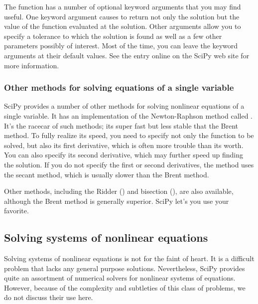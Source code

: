 \documentclass[letterpaper,10pt,english]{sphinxmanual}
\begin{document}
The  function has a number of optional keyword arguments that you may find useful.  One keyword argument causes  to return not only the solution but the value of the function evaluated at the solution.  Other arguments allow you to specify a tolerance to which the solution is found as well as a few other parameters possibly of interest.  Most of the time, you can leave the keyword arguments at their default values.  See the  entry online on the SciPy web site for more information.


\subsubsection{Other methods for solving equations of a single variable}
\label{chap9/chap9_scipy:index-13}\label{chap9/chap9_scipy:other-methods-for-solving-equations-of-a-single-variable}
SciPy provides a number of other methods for solving nonlinear equations of a single variable.  It has an implementation of the Newton-Raphson method called .  It's the racecar of such methods; its super fast but less stable that the Brent method.  To fully realize its speed, you need to specify not only the function to be solved, but also its first derivative, which is often more trouble than its worth.  You can also specify its second derivative, which may further speed up finding the solution.  If you do not specify the first or second derivatives, the method uses the secant method, which is usually slower than the Brent method.

Other methods, including the Ridder () and bisection (), are also available, although the Brent method is generally superior.  SciPy let's you use your favorite.


\subsection{Solving systems of nonlinear equations}
\label{chap9/chap9_scipy:solving-systems-of-nonlinear-equations}\label{chap9/chap9_scipy:index-15}
Solving systems of nonlinear equations is not for the faint of heart.  It is a difficult problem that lacks any general purpose solutions.  Nevertheless, SciPy provides quite an assortment of numerical solvers for nonlinear systems of equations.  However, because of the complexity and subtleties of this class of problems, we do not discuss their use here.
\newpage
\end{document}
